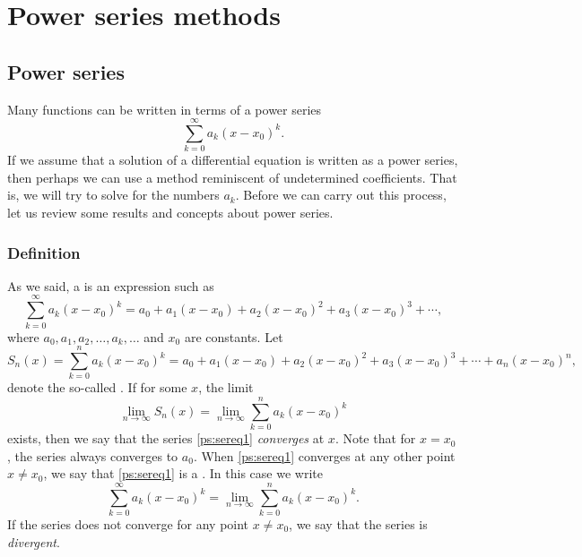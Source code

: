 \chapter{Power series methods} \label{ps:chapter}


\section{Power series}
\label{powerseries:section}


Many functions can be written in terms of a power series
\begin{equation*}
\sum_{k=0}^\infty a_k {(x-x_0)}^k .
\end{equation*}
If we assume that a solution of a differential equation is written as a
power series, then perhaps we can use a method reminiscent of undetermined
coefficients.  That is, we will try to solve for the numbers $a_k$.
Before we can carry out this process, let us review some results
and concepts about power series.

\subsection{Definition}

As we said, a \emph{} is an expression such as
\begin{equation} \label{ps:sereq1}
\sum_{k=0}^\infty a_k {(x-x_0)}^k =
a_0 + 
a_1 (x-x_0) +
a_2 {(x-x_0)}^2 +
a_3 {(x-x_0)}^3 + \cdots,
\end{equation}
where $a_0,a_1,a_2,\ldots,a_k,\ldots$ and $x_0$ are constants.  Let
\begin{equation*}
S_n(x) = \sum_{k=0}^n a_k {(x-x_0)}^k =
a_0 + a_1 (x-x_0) + a_2 {(x-x_0)}^2 + a_3 {(x-x_0)}^3 + \cdots + a_n {(x-x_0)}^n ,
\end{equation*}
denote the so-called \emph{}.  If for some $x$,
the limit
\begin{equation*}
\lim_{n\to \infty} S_n(x) = \lim_{n\to\infty} \sum_{k=0}^n a_k {(x-x_0)}^k
\end{equation*}
exists, then we say that the series \eqref{ps:sereq1}
\emph{converges} at $x$.
Note that for $x=x_0$, the series always converges to $a_0$.
When \eqref{ps:sereq1}
converges at any other point $x \not= x_0$,
we say that \eqref{ps:sereq1} is a
\emph{}.  In this case we write
\begin{equation*}
\sum_{k=0}^\infty a_k {(x-x_0)}^k = 
\lim_{n\to\infty} \sum_{k=0}^n a_k {(x-x_0)}^k.
\end{equation*}
If the series does not converge for any point $x \not= x_0$, we say that
the series is \emph{divergent}.

